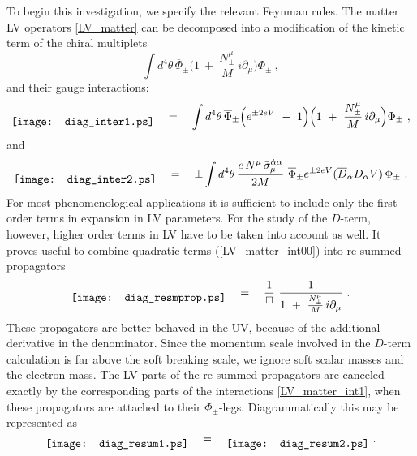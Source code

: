 \documentclass[12pt]{revtex4}
\begin{document}
To begin this investigation, we specify the relevant Feynman rules. 
The matter LV operators \eqref{LV_matter} can be decomposed into
a modification of the kinetic term of the chiral multiplets 
%
\begin{equation} 
\int d^4\theta\, 
\overline{\Phi}_\pm 
\Big( 1 ~+~ \frac{N_\pm^\mu}{M} \, i \partial_\mu  \Big) 
\Phi_\pm~, 
\label{LV_matter_int00}
\end{equation}
%
and their gauge interactions:
%
\begin{equation} 
\raisebox{-1ex}{\texttt{[image: diag\_inter1.ps]}}
\quad = \quad 
\int d^4\theta\, 
\overline{\Phi}_\pm 
\Big(  e^{\pm 2 e V} ~-~ 1 \Big) 
\Big( 1 ~+~ \frac{N_\pm^\mu}{M} \, i \partial_\mu  \Big) 
\Phi_\pm~, 
\label{LV_matter_int1}
\end{equation}
%
and 
%
\begin{equation}
\raisebox{-1ex}{\texttt{[image: diag\_inter2.ps]}}
\quad = \quad 
\pm \int d^4\theta\, 
\frac {e \, N^\mu \, \bar\sigma_\mu^{\dot\alpha\alpha}}{2M} ~ 
\overline{\Phi}_\pm 
e^{\pm 2eV} 
( \overline{D}_{\dot\alpha} D_\alpha V) \, 
\Phi_\pm~. 
\label{LV_matter_int2}
\end{equation} 
%
For most  phenomenological applications it is sufficient to include
only the first order terms in expansion in LV parameters. For 
the study of the $D$-term, however, higher order terms in LV have to be
taken into account as well. It proves useful to combine quadratic
terms (\ref{LV_matter_int00}) into re-summed  propagators 
%
\begin{equation} 
\raisebox{-1ex}{\texttt{[image: diag\_resmprop.ps]}}
\quad = \quad 
\frac 1{\Box}~  \frac 1{1 ~+~  \frac{ N_\pm^\mu} M \, i\partial_\mu}~. 
\end{equation} 
%
These propagators are better behaved in the UV, because of the additional 
derivative in the denominator. Since the momentum scale involved in
the $D$-term calculation is far above the soft breaking scale, we
ignore soft scalar masses and the electron mass. The LV parts of the
re-summed propagators are canceled exactly by the corresponding parts of
the interactions \eqref{LV_matter_int1}, when these propagators are
attached to their $\Phi_\pm$-legs. Diagrammatically this may be 
represented as  
%
\begin{equation}
\raisebox{-1ex}{\texttt{[image: diag\_resum1.ps]}}
\quad = \quad 
\raisebox{-1ex}{\texttt{[image: diag\_resum2.ps]}}
~. 
\label{ResummedPropVer}
\end{equation}
\end{document}
